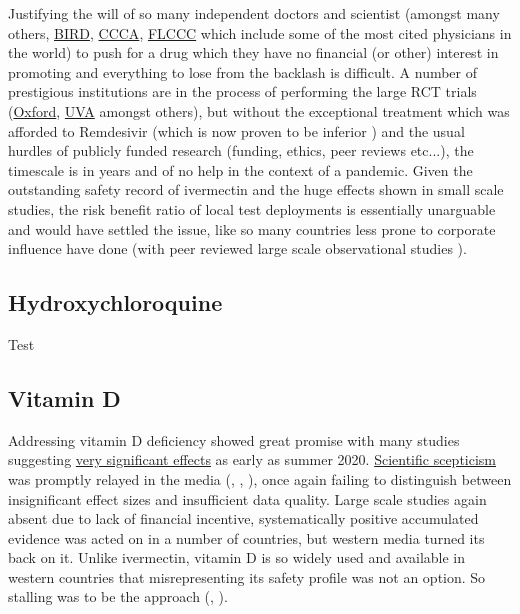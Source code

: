 \documentclass[11pt,a4paper]{article}
\begin{document}
Justifying the will of so many independent doctors and scientist (amongst many others, \href{https://bird-group.org/where-it-all-began/}{BIRD}, \href{https://www.canadiancovidcarealliance.org/treatment-protocols/}{CCCA}, \href{https://covid19criticalcare.com/ivermectin-in-covid-19/}{FLCCC} which include some of the most cited physicians in the world) to push for a drug which they have no financial (or other) interest in promoting and everything to lose from the backlash is difficult. A number of prestigious institutions are in the process of performing the large RCT trials (\href{https://www.principletrial.org/news/ivermectin-to-be-investigated-as-a-possible-treatment-for-covid-19-in-oxford2019s-principle-trial}{Oxford}, \href{https://news.virginia.edu/content/uva-health-joins-national-trial-testing-medications-mild-moderate-covid-19}{UVA} amongst others), but without the exceptional treatment which was afforded to Remdesivir (which is now proven to be inferior \cite{EFIMENKO2022S40}) and the usual hurdles of publicly funded research (funding, ethics, peer reviews etc...), the timescale is in years and of no help in the context of a pandemic. Given the outstanding safety record of ivermectin and the huge effects shown in small scale studies, the risk benefit ratio of local test deployments is essentially unarguable and would have settled the issue, like so many countries less prone to corporate influence have done (with peer reviewed large scale observational studies \cite{Kerr2022-ps}). 

\subsection*{Hydroxychloroquine}

Test \cite{Lagier2020-dw} \cite{Mokhtari2021-ot} \cite{guardian25052020} \cite{guardian03062020} \cite{guardian03062020b} \cite{francesoir25062020}
\cite{newindianexpress29052020}

\subsection*{Vitamin D}

Addressing vitamin D deficiency showed great promise with many studies suggesting \href{https://c19vitamind.com/}{very significant effects} as early as summer 2020. \href{https://www.nice.org.uk/guidance/ng187}{Scientific scepticism} was promptly relayed in the media (\cite{guardian29062020}, \cite{guardian29032021}, \cite{bbc17112020}), once again failing to distinguish between insignificant effect sizes and insufficient data quality. Large scale studies again absent due to lack of financial incentive, systematically positive accumulated evidence was acted on in a number of countries, but western media turned its back on it. Unlike ivermectin, vitamin D is so widely used and available in western countries that misrepresenting its safety profile was not an option. So stalling was to be the approach (\cite{bbc05042021}, \cite{guardian29022021}). 
\end{document}
